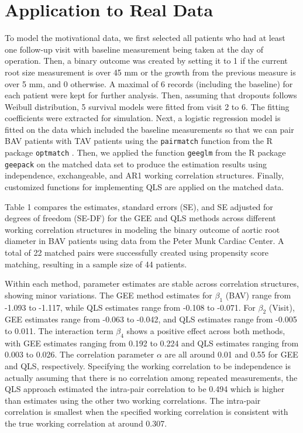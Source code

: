 \documentclass[
]{aft}
\begin{document}
\section{Application to Real Data}\label{application-to-real-data}

To model the motivational data, we first selected all patients who had
at least one follow-up visit with baseline measurement being taken at
the day of operation. Then, a binary outcome was created by setting it
to 1 if the current root size measurement is over 45 mm or the growth
from the previous measure is over 5 mm, and 0 otherwise. A maximal of 6
records (including the baseline) for each patient were kept for further
analysis. Then, assuming that dropouts follows Weibull distribution, 5
survival models were fitted from visit 2 to 6. The fitting coefficients
were extracted for simulation. Next, a logistic regression model is
fitted on the data which included the baseline measurements so that we
can pair BAV patients with TAV patients using the \texttt{pairmatch}
function from the R package \texttt{optmatch} \citep{optmatch}. Then, we
applied the function \texttt{geeglm} from the R package \texttt{geepack}
on the matched data set to produce the estimation results using
independence, exchangeable, and AR1 working correlation structures.
Finally, customized functions for implementing QLS are applied on the
matched data.

Table 1 compares the estimates, standard errors (SE), and SE adjusted
for degrees of freedom (SE-DF) for the GEE and QLS methods across
different working correlation structures in modeling the binary outcome
of aortic root diameter in BAV patients using data from the Peter Munk
Cardiac Center. A total of 22 matched pairs were successfully created
using propensity score matching, resulting in a sample size of 44
patients.

Within each method, parameter estimates are stable across correlation
structures, showing minor variations. The GEE method estimates for
\(\beta_1\) (BAV) range from -1.093 to -1.117, while QLS estimates range
from -0.108 to -0.071. For \(\beta_2\) (Visit), GEE estimates range from
-0.063 to -0.042, and QLS estimates range from -0.005 to 0.011. The
interaction term \(\beta_4\) shows a positive effect across both
methods, with GEE estimates ranging from 0.192 to 0.224 and QLS
estimates ranging from 0.003 to 0.026. The correlation parameter
\(\alpha\) are all around 0.01 and 0.55 for GEE and QLS, respectively.
Specifying the working correlation to be independence is actually
assuming that there is no correlation among repeated measurements, the
QLS approach estimated the intra-pair correlation to be 0.494 which is
higher than estimates using the other two working correlations. The
intra-pair correlation is smallest when the specified working
correlation is consistent with the true working correlation at around
0.307.
\end{document}
